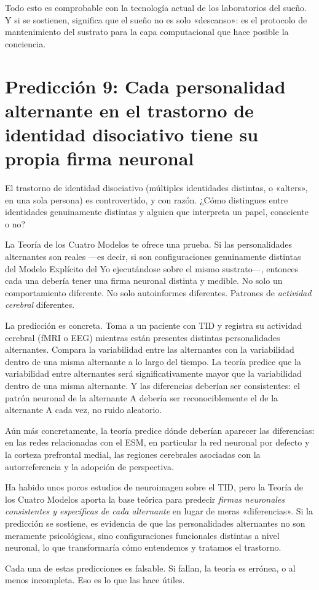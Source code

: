 \documentclass[11pt, twoside, openright]{book}
\begin{document}
Todo esto es comprobable con la tecnología actual de los laboratorios del sueño. Y si se sostienen, significa que el sueño no es solo «descanso»: es el protocolo de mantenimiento del sustrato para la capa computacional que hace posible la conciencia.

\section*{Predicción 9: Cada personalidad alternante en el trastorno de identidad disociativo tiene su propia firma neuronal}

El trastorno de identidad disociativo (múltiples identidades distintas, o «alters», en una sola persona) es controvertido, y con razón. ¿Cómo distingues entre identidades genuinamente distintas y alguien que interpreta un papel, consciente o no?

La Teoría de los Cuatro Modelos te ofrece una prueba. Si las personalidades alternantes son reales ---es decir, si son configuraciones genuinamente distintas del Modelo Explícito del Yo ejecutándose sobre el mismo sustrato---, entonces cada una debería tener una firma neuronal distinta y medible. No solo un comportamiento diferente. No solo autoinformes diferentes. Patrones de \textit{actividad cerebral} diferentes.

La predicción es concreta. Toma a un paciente con TID y registra su actividad cerebral (fMRI o EEG) mientras están presentes distintas personalidades alternantes. Compara la variabilidad entre las alternantes con la variabilidad dentro de una misma alternante a lo largo del tiempo. La teoría predice que la variabilidad entre alternantes será significativamente mayor que la variabilidad dentro de una misma alternante. Y las diferencias deberían ser consistentes: el patrón neuronal de la alternante A debería ser reconociblemente el de la alternante A cada vez, no ruido aleatorio.

Aún más concretamente, la teoría predice dónde deberían aparecer las diferencias: en las redes relacionadas con el ESM, en particular la red neuronal por defecto y la corteza prefrontal medial, las regiones cerebrales asociadas con la autorreferencia y la adopción de perspectiva.

Ha habido unos pocos estudios de neuroimagen sobre el TID, pero la Teoría de los Cuatro Modelos aporta la base teórica para predecir \textit{firmas neuronales consistentes y específicas de cada alternante} en lugar de meras «diferencias». Si la predicción se sostiene, es evidencia de que las personalidades alternantes no son meramente psicológicas, sino configuraciones funcionales distintas a nivel neuronal, lo que transformaría cómo entendemos y tratamos el trastorno.

Cada una de estas predicciones es falsable. Si fallan, la teoría es errónea, o al menos incompleta. Eso es lo que las hace útiles.
\end{document}
